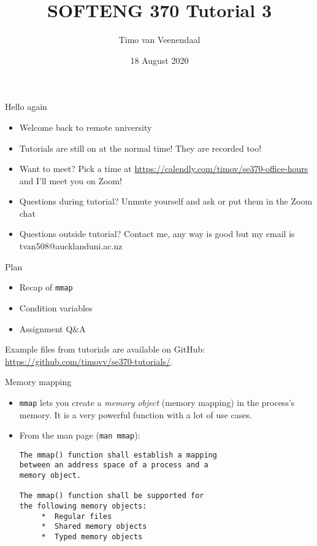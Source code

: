 \documentclass[notes]{beamer}
\title{SOFTENG 370 Tutorial 3}
\author{Timo van Veenendaal}
\date{18 August 2020}
\begin{document}
\maketitle

\begin{frame}{Hello again}
    \begin{itemize}
	\item Welcome back to remote university
	\item Tutorials are still on at the normal time! They are recorded too!
	\item Want to meet? Pick a time at \url{https://calendly.com/timov/se370-office-hours} and I'll meet you on Zoom!
	\item Questions during tutorial? Unmute yourself and ask or put them in the Zoom chat
	\item Questions outside tutorial? Contact me, any way is good but my email is tvan508@aucklanduni.ac.nz
    \end{itemize}
\end{frame}

\begin{frame}{Plan}
    \begin{itemize}
	\item Recap of \texttt{mmap}
	\item Condition variables
	\item Assignment Q\&A
    \end{itemize}
    Example files from tutorials are available on GitHub: \url{https://github.com/timovv/se370-tutorials/}.
\end{frame}

\begin{frame}[fragile]{Memory mapping}
     \begin{itemize}
	 \item \texttt{mmap} lets you create a \textit{memory object} (memory mapping) in the process's memory. It is a very powerful function with a lot of use cases.
	\item From the man page (\texttt{man mmap}):

\begin{verbatim}
The mmap() function shall establish a mapping
between an address space of a process and a
memory object.

The mmap() function shall be supported for
the following memory objects:
     *  Regular files
     *  Shared memory objects
     *  Typed memory objects
\end{verbatim}
     \end{itemize}
\end{frame}
\end{document}
